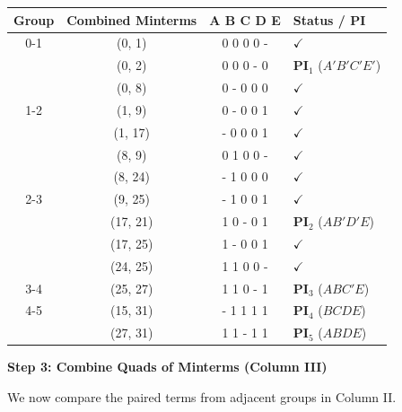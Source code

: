 \documentclass[12pt,a3paper]{article}
\begin{document}
\begin{enumerate}
\begin{tcolorbox}[enhanced,breakable,ansbox,colback=cC!4,colframe=cC,boxrule=0.8pt,arc=5pt,title={\textbf{Answer}},fonttitle=\bfseries\color{white},colbacktitle=cC]
\begin{center}
\begin{tabular}{cccl}
\toprule
\textbf{Group} & \textbf{Combined Minterms} & \textbf{A B C D E} & \textbf{Status / PI} \\
\midrule
0-1 & (0, 1)  & 0 0 0 0 - & $\checkmark$ \\
    & (0, 2)  & 0 0 0 - 0 & \textcolor{cC}{\textbf{PI$_1$}} ($A'B'C'E'$) \\
    & (0, 8)  & 0 - 0 0 0 & $\checkmark$ \\
\midrule
1-2 & (1, 9)  & 0 - 0 0 1 & $\checkmark$ \\
    & (1, 17) & - 0 0 0 1 & $\checkmark$ \\
    & (8, 9)  & 0 1 0 0 - & $\checkmark$ \\
    & (8, 24) & - 1 0 0 0 & $\checkmark$ \\
\midrule
2-3 & (9, 25) & - 1 0 0 1 & $\checkmark$ \\
    & (17, 21)& 1 0 - 0 1 & \textcolor{cC}{\textbf{PI$_2$}} ($AB'D'E$) \\
    & (17, 25)& 1 - 0 0 1 & $\checkmark$ \\
    & (24, 25)& 1 1 0 0 - & $\checkmark$ \\
\midrule
3-4 & (25, 27)& 1 1 0 - 1 & \textcolor{cC}{\textbf{PI$_3$}} ($ABC'E$) \\
\midrule
4-5 & (15, 31)& - 1 1 1 1 & \textcolor{cC}{\textbf{PI$_4$}} ($BCDE$) \\
    & (27, 31)& 1 1 - 1 1 & \textcolor{cC}{\textbf{PI$_5$}} ($ABDE$) \\
\bottomrule
\end{tabular}
\end{center}

\vspace{1em}
\textbf{\large Step 3: Combine Quads of Minterms (Column III)}

We now compare the paired terms from adjacent groups in Column II.


\end{tcolorbox}
\end{enumerate}
\end{document}
